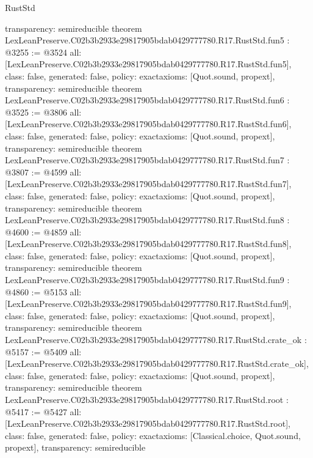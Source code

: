 \begin{lexlean}{RustStd}
\begin{coremodule}
{  transparency: semireducible
}
theorem LexLeanPreserve.C02b3b2933e29817905bdab0429777780.R17.RustStd.fun5 : @3255 := @3524 {
  all: [LexLeanPreserve.C02b3b2933e29817905bdab0429777780.R17.RustStd.fun5],
  class: false,
  generated: false,
  policy: exact{axioms: [Quot.sound, propext]},
  transparency: semireducible
}
theorem LexLeanPreserve.C02b3b2933e29817905bdab0429777780.R17.RustStd.fun6 : @3525 := @3806 {
  all: [LexLeanPreserve.C02b3b2933e29817905bdab0429777780.R17.RustStd.fun6],
  class: false,
  generated: false,
  policy: exact{axioms: [Quot.sound, propext]},
  transparency: semireducible
}
theorem LexLeanPreserve.C02b3b2933e29817905bdab0429777780.R17.RustStd.fun7 : @3807 := @4599 {
  all: [LexLeanPreserve.C02b3b2933e29817905bdab0429777780.R17.RustStd.fun7],
  class: false,
  generated: false,
  policy: exact{axioms: [Quot.sound, propext]},
  transparency: semireducible
}
theorem LexLeanPreserve.C02b3b2933e29817905bdab0429777780.R17.RustStd.fun8 : @4600 := @4859 {
  all: [LexLeanPreserve.C02b3b2933e29817905bdab0429777780.R17.RustStd.fun8],
  class: false,
  generated: false,
  policy: exact{axioms: [Quot.sound, propext]},
  transparency: semireducible
}
theorem LexLeanPreserve.C02b3b2933e29817905bdab0429777780.R17.RustStd.fun9 : @4860 := @5153 {
  all: [LexLeanPreserve.C02b3b2933e29817905bdab0429777780.R17.RustStd.fun9],
  class: false,
  generated: false,
  policy: exact{axioms: [Quot.sound, propext]},
  transparency: semireducible
}
theorem LexLeanPreserve.C02b3b2933e29817905bdab0429777780.R17.RustStd.crate_ok : @5157 := @5409 {
  all: [LexLeanPreserve.C02b3b2933e29817905bdab0429777780.R17.RustStd.crate_ok],
  class: false,
  generated: false,
  policy: exact{axioms: [Quot.sound, propext]},
  transparency: semireducible
}
theorem LexLeanPreserve.C02b3b2933e29817905bdab0429777780.R17.RustStd.root : @5417 := @5427 {
  all: [LexLeanPreserve.C02b3b2933e29817905bdab0429777780.R17.RustStd.root],
  class: false,
  generated: false,
  policy: exact{axioms: [Classical.choice, Quot.sound, propext]},
  transparency: semireducible
}


\end{coremodule}
\end{lexlean}
